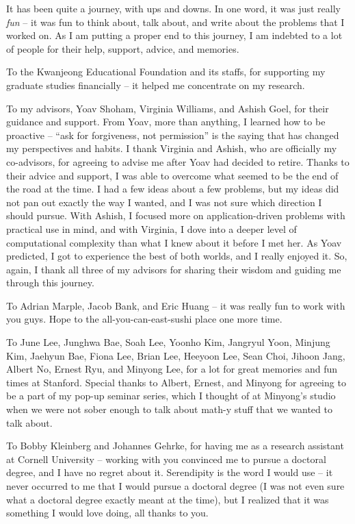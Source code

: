It has been quite a journey, with ups and downs.
In one word, it was just really {\em fun} -- it was fun to think about, talk about, and write about the problems that I worked on. 
As I am putting a proper end to this journey, I am indebted to a lot of people for their help, support, advice, and memories.

To the Kwanjeong Educational Foundation and its staffs, for supporting my graduate studies financially -- it helped me concentrate on my research.

To my advisors, Yoav Shoham, Virginia Williams, and Ashish Goel, for their guidance and support. From Yoav, more than anything, I learned how to be proactive -- ``ask for forgiveness, not permission'' is the saying that has changed my perspectives and habits. I thank Virginia and Ashish, who are officially my co-advisors, for agreeing to advise me after Yoav had decided to retire. Thanks to their advice and support, I was able to overcome what seemed to be the end of the road at the time. I had a few ideas about a few problems, but my ideas did not pan out exactly the way I wanted, and I was not sure which direction I should pursue. With Ashish, I focused more on application-driven problems with practical use in mind, and with Virginia, I dove into a deeper level of computational complexity than what I knew about it before I met her. As Yoav predicted, I got to experience the best of both worlds, and I really enjoyed it. So, again, I thank all three of my advisors for sharing their wisdom and guiding me through this journey.

To Adrian Marple, Jacob Bank, and Eric Huang -- it was really fun to work with you guys. Hope to the all-you-can-east-sushi place one more time.

To June Lee, Junghwa Bae, Soah Lee, Yoonho Kim, Jangryul Yoon, Minjung Kim, Jaehyun Bae, Fiona Lee, Brian Lee, Heeyoon Lee, Sean Choi, Jihoon Jang, Albert No, Ernest Ryu, and Minyong Lee, for a lot for great memories and fun times at Stanford. Special thanks to Albert, Ernest, and Minyong for agreeing to be a part of my pop-up seminar series, which I thought of at Minyong's studio when we were not sober enough to talk about math-y stuff that we wanted to talk about. 

To Bobby Kleinberg and Johannes Gehrke, for having me as a research assistant at Cornell University -- working with you convinced me to pursue a doctoral degree, and I have no regret about it. Serendipity is the word I would use -- it never occurred to me that I would pursue a doctoral degree (I was not even sure what a doctoral degree exactly meant at the time), but I realized that it was something I would love doing, all thanks to you. 

